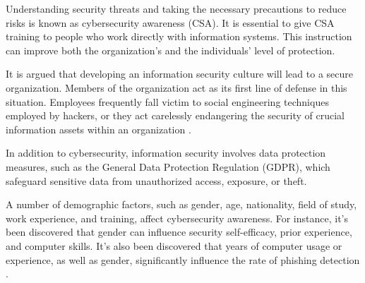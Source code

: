 \documentclass[journal]{IEEEtran}
\begin{document}
Understanding security threats and taking the necessary precautions to reduce risks is known as cybersecurity awareness (CSA). It is essential to give CSA training to people who work directly with information systems. This instruction can improve both the organization's and the individuals' level of protection.

It is argued that developing an information security culture will lead to a secure organization. Members of the organization act as its first line of defense in this situation. Employees frequently fall victim to social engineering techniques employed by hackers, or they act carelessly endangering the security of crucial information assets within an organization \cite{Steps_article2}.

In addition to cybersecurity, information security involves data protection measures, such as the General Data Protection Regulation (GDPR), which safeguard sensitive data from unauthorized access, exposure, or theft.

A number of demographic factors, such as gender, age, nationality, field of study, work experience, and training, affect cybersecurity awareness. For instance, it's been discovered that gender can influence security self-efficacy, prior experience, and computer skills. It's also been discovered that years of computer usage or experience, as well as gender, significantly influence the rate of phishing detection \cite{Edu_article1}.




%
%
\end{document}
